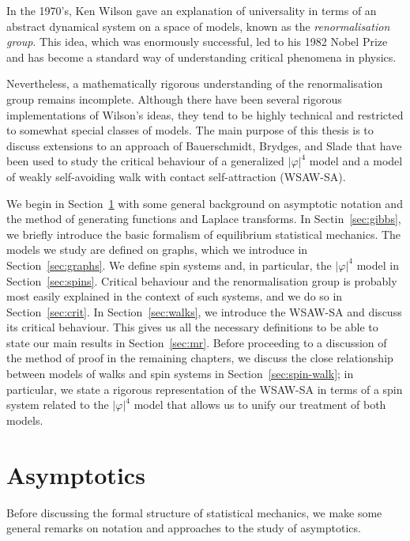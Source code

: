 In the 1970's, Ken Wilson gave an explanation of universality in terms of an
abstract dynamical system on a space of models, known as the \emph{renormalisation
group}. This idea, which was enormously successful, led to his 1982 Nobel Prize and has
become a standard way of understanding critical phenomena in physics.

Nevertheless, a mathematically rigorous understanding of the renormalisation group
remains incomplete. Although there have been several rigorous implementations of
Wilson's ideas, they tend to be highly technical and restricted to somewhat special
classes of models. The main purpose of this thesis is to discuss extensions to an
approach of Bauerschmidt, Brydges, and Slade that have been used to study the
critical behaviour of a generalized $|\varphi|^4$ model and a model of weakly
self-avoiding walk with contact self-attraction (WSAW-SA).

We begin in Section~\ref{sec:asymp} with some general background on asymptotic
notation and the method of generating functions and Laplace transforms. In
Sectin~\ref{sec:gibbs}, we briefly introduce the basic formalism of equilibrium
statistical mechanics. The models we study are defined on graphs, which we
introduce in Section~\ref{sec:graphs}. We define spin systems and, in particular,
the $|\varphi|^4$ model in Section~\ref{sec:spins}. Critical behaviour and
the renormalisation group is probably most easily explained in the context of such
systems, and we do so in Section~\ref{sec:crit}. In Section~\ref{sec:walks},
we introduce the WSAW-SA and discuss its critical behaviour. This gives us all
the necessary definitions to be able to state our main results in Section~\ref{sec:mr}.
Before proceeding to a discussion of the method of proof in the remaining chapters,
we discuss the close relationship between models of walks and spin systems in
Section~\ref{sec:spin-walk}; in particular, we state a rigorous representation
of the WSAW-SA in terms of a spin system related to the $|\varphi|^4$ model
that allows us to unify our treatment of both models.


\section{Asymptotics}
\label{sec:asymp}

Before discussing the formal structure of statistical mechanics, we make some
general remarks on notation and approaches to the study of asymptotics.

